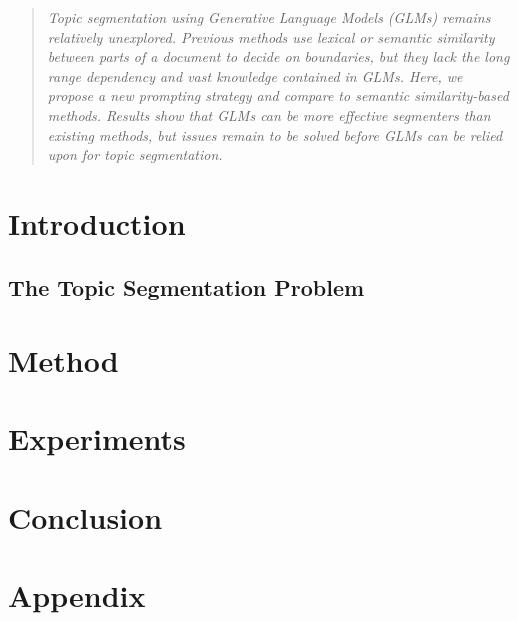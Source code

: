 \documentclass{article}
\begin{document}

\begin{abstract}
\emph{
    Topic segmentation using Generative Language Models (GLMs) remains relatively unexplored. Previous methods use lexical or semantic similarity between parts of a document to decide on boundaries, but they lack the long range dependency and vast knowledge contained in GLMs. Here, we propose a new prompting strategy and compare to semantic similarity-based methods. Results show that GLMs can be more effective segmenters than existing methods, but issues remain to be solved before GLMs can be relied upon for topic segmentation.
}
\end{abstract}

\section{Introduction}

\subsection{The Topic Segmentation Problem}



\section{Method}




\section{Experiments}\label{Results}



\section{Conclusion}\label{Conclusion}







\appendix
\section{Appendix}\label{Appendix}

\end{document}

